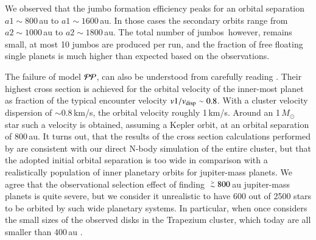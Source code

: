\documentclass[aa]{lib/aa}
\newcommand{\MSun}{\mbox{${M}_\odot$}}
\def\apgt{\ {\raise-.5ex\hbox{$\buildrel>\over\sim$}}\ }
\begin{document}
We observed that the jumbo formation efficiency peaks for an orbital
separation $a1 \sim 800$\,au to $a1 \sim 1600$\,au. In those cases the
secondary orbits range from $a2 \sim 1000$\,au to $a2 \sim 1800$\,au.
The total number of jumbos\, however, remains small, at most 10 jumbos
are produced per run, and the fraction of free floating single planets
is much higher than expected based on the observations.

The failure of model ${\cal PP}$, can also be understood from
carefully reading \cite{2023arXiv231006016W}. Their highest cross
section is achieved for the orbital velocity of the inner-most planet
as fraction of the typical encounter velocity $v1/v_{\rm disp} \sim
0.8$. With a cluster velocity dispersion of $\sim 0.8$\,km/s, the
orbital velocity roughly 1\,km/s. Around an 1\,\MSun\, star such a
velocity is obtained, assuming a Kepler orbit, at an orbital
separation of 800\,au. It turns out, that the results of the cross
section calculations performed by \cite{2023arXiv231006016W} are
consistent with our direct N-body simulation of the entire cluster,
but that the adopted initial orbital separation is too wide in
comparison with a realistically population of inner planetary orbits
for jupiter-mass planets.  We agree that the observational selection
effect of finding $\apgt 800$\,au jupiter-mass planets is quite
severe, but we consider it unrealistic to have 600 out of 2500 stars
to be orbited by such wide planetary systems. In particular, when once
considers the small sizes of the observed disks in the Trapezium
cluster, which today are all smaller than 400\,au
\citep{2005A&A...441..195V}.
\end{document}

